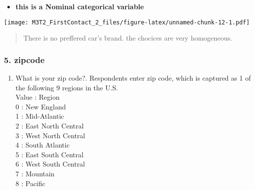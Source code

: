 \documentclass[
]{article}
\newenvironment{Shaded}{\begin{snugshade}}{\end{snugshade}}
\newcommand{\AttributeTok}[1]{\textcolor[rgb]{0.77,0.63,0.00}{#1}}
\newcommand{\CommentTok}[1]{\textcolor[rgb]{0.56,0.35,0.01}{\textit{#1}}}
\newcommand{\ConstantTok}[1]{\textcolor[rgb]{0.00,0.00,0.00}{#1}}
\newcommand{\DecValTok}[1]{\textcolor[rgb]{0.00,0.00,0.81}{#1}}
\newcommand{\FloatTok}[1]{\textcolor[rgb]{0.00,0.00,0.81}{#1}}
\newcommand{\FunctionTok}[1]{\textcolor[rgb]{0.00,0.00,0.00}{#1}}
\newcommand{\NormalTok}[1]{#1}
\newcommand{\OtherTok}[1]{\textcolor[rgb]{0.56,0.35,0.01}{#1}}
\newcommand{\SpecialCharTok}[1]{\textcolor[rgb]{0.00,0.00,0.00}{#1}}
\newcommand{\StringTok}[1]{\textcolor[rgb]{0.31,0.60,0.02}{#1}}
\providecommand{\tightlist}{%
  \setlength{\itemsep}{0pt}\setlength{\parskip}{0pt}}
\begin{document}
\begin{itemize}
\tightlist
\item
  \textbf{this is a Nominal categorical variable}
\end{itemize}

\begin{Shaded}
\end{Shaded}

\texttt{[image: M3T2\_FirstContact\_2\_files/figure-latex/unnamed-chunk-12-1.pdf]}

\begin{quote}
There is no preffered car's brand. the chocices are very homogeneous.
\end{quote}

\hypertarget{zipcode}{%
\subsubsection{5. zipcode}\label{zipcode}}

\begin{enumerate}
\def\labelenumi{\arabic{enumi})}
\setcounter{enumi}{4}
\tightlist
\item
  What is your zip code?. Respondents enter zip code, which is captured
  as 1 of the following 9 regions in the U.S.\\
  Value : Region\\
  0 : New England\\
  1 : Mid-Atlantic\\
  2 : East North Central\\
  3 : West North Central\\
  4 : South Atlantic\\
  5 : East South Central\\
  6 : West South Central\\
  7 : Mountain\\
  8 : Pacific
\end{enumerate}
\end{document}
